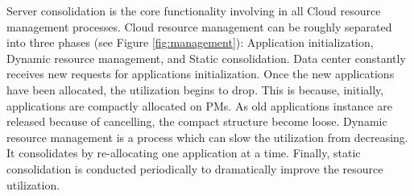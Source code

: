 Server consolidation is the core functionality involving in all Cloud resource management processes. Cloud resource management can be roughly separated into three phases \cite{Svard:2015ic, Mishra:2012kx} (see Figure \ref{fig:management}): Application initialization, Dynamic resource management, and Static consolidation. Data center constantly receives new requests for applications initialization. Once the new applications have been allocated, the utilization begins to drop. This is because, initially, applications are compactly allocated on PMs. As old applications instance are released because of cancelling, the compact structure become loose. Dynamic resource management is a process which can slow the utilization from decreasing. It consolidates by re-allocating one application at a time. Finally, static consolidation is conducted periodically to dramatically improve the resource utilization.
